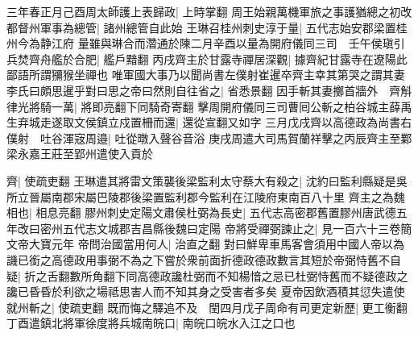 三年春正月己酉周太師護上表歸政|{
	上時掌翻}
周王始親萬機軍旅之事護猶總之初改都督州軍事為總管|{
	諸州總管自此始}
王琳召桂州刺史淳于量|{
	五代志始安郡梁置桂州今為静江府}
量雖與琳合而濳通於陳二月辛酉以量為開府儀同三司　壬午侯瑱引兵焚齊舟艦於合肥|{
	艦戶黯翻}
丙戌齊主於甘露寺禪居深觀|{
	據齊紀甘露寺在遼陽此鄙語所謂獼猴坐禪也}
唯軍國大事乃以聞尚書左僕射崔暹卒齊主幸其第哭之謂其妻李氏曰頗思暹乎對曰思之帝曰然則自往省之|{
	省悉景翻}
因手斬其妻擲首牆外　齊斛律光將騎一萬|{
	將即亮翻下同騎奇寄翻}
擊周開府儀同三司曹囘公斬之柏谷城主薛禹生弃城走遂取文侯鎮立戍置柵而還|{
	還從宣翻又如字}
三月戊戌齊以高德政為尚書右僕射　吐谷渾宼周邉|{
	吐從暾入聲谷音浴}
庚戌周遣大司馬賀蘭祥擊之丙辰齊主至鄴　梁永嘉王莊至郢州遣使入貢於

齊|{
	使疏吏翻}
王琳遣其將雷文策襲後梁監利太守蔡大有殺之|{
	沈約曰監利縣疑是吳所立晉屬南郡宋屬巴陵郡後梁置監利郡今監利在江陵府東南百八十里}
齊主之為魏相也|{
	相息亮翻}
膠州刺史定陽文肅侯杜弼為長史|{
	五代志高密郡舊置膠州唐武德五年改曰密州五代志文城郡吉昌縣後魏曰定陽}
帝將受禪弼諫止之|{
	見一百六十三卷簡文帝大寶元年}
帝問治國當用何人|{
	治直之翻}
對曰鮮卑車馬客會須用中國人帝以為譏已銜之高德政用事弼不為之下嘗於衆前面折德政德政數言其短於帝弼恃舊不自疑|{
	折之舌翻數所角翻下同高德政讒杜弼而不知楊愔之忌已杜弼恃舊而不疑德政之讒已昏昏於利欲之場祗思害人而不知其身之受害者多矣}
夏帝因飲酒積其愆失遣使就州斬之|{
	使疏吏翻}
既而悔之驛追不及　閏四月戊子周命有司更定新歷|{
	更工衡翻}
丁酉遣鎮北將軍徐度將兵城南皖口|{
	南皖口皖水入江之口也}


